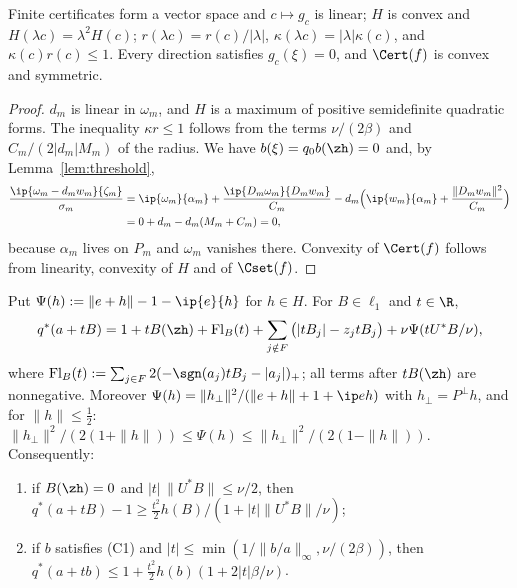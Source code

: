 \begin{lemma}[Algebra]\label{lem:algebra}
Finite certificates form a vector space and $c\mapsto g_c$ is linear; $H$ is
convex and $H(\lambda c)=\lambda^2H(c)$; $r(\lambda c)=r(c)/|\lambda|$,
$\kappa(\lambda c)=|\lambda|\kappa(c)$, and $\kappa(c)r(c)\le1$.  Every
direction satisfies $g_c(\xi)=0$, and $\Cert(f)$ is convex and symmetric.
\end{lemma}

\begin{proof}
$d_m$ is linear in $\omega_m$, and $H$ is a maximum of positive
semidefinite quadratic forms.  The inequality $\kappa r\le1$ follows from
the terms $\nu/(2\beta)$ and $C_m/(2|d_m|M_m)$ of the radius.  We have
$b(\xi)=q_0b(\zh)=0$ and, by Lemma~\ref{lem:threshold},
\begin{align*}
 \frac{\ip{\omega_m-d_mw_m}{\zeta_m}}{\sigma_m}
 &=\ip{\omega_m}{\alpha_m}+\frac{\ip{D_m\omega_m}{D_mw_m}}{C_m}
 -d_m\Big(\ip{w_m}{\alpha_m}+\frac{\|D_mw_m\|^2}{C_m}\Big)\\
 &=0+d_m-d_m(M_m+C_m)=0,
\end{align*}
because $\alpha_m$ lives on $P_m$ and $\omega_m$ vanishes there.  Convexity
of $\Cert(f)$ follows from linearity, convexity of $H$ and of $\Cset(f)$.
\end{proof}

\begin{lemma}\label{lem:base}
Put $\Psi(h):=\|e+h\|-1-\ip{e}{h}$ for $h\in H$.  For $B\in\ell_1$ and
$t\in\R$,
\begin{equation}\label{eq:baseidentity}
 q^*(a+tB)=1+tB(\zh)+\mathrm{Fl}_B(t)+\sum_{j\notin F}\big(|tB_j|-z_jtB_j\big)
 +\nu\Psi(tU^*B/\nu),
\end{equation}
where $\mathrm{Fl}_B(t):=\sum_{j\in F}2(-\sgn(a_j)tB_j-|a_j|)_+$; all terms
after $tB(\zh)$ are nonnegative.  Moreover
$\Psi(h)=\|h_\perp\|^2/(\|e+h\|+1+\ip eh)$ with $h_\perp=P^\perp h$, and
for $\|h\|\le\frac12$:
$\|h_\perp\|^2/(2(1+\|h\|))\le\Psi(h)\le\|h_\perp\|^2/(2(1-\|h\|))$.
Consequently:
\begin{enumerate}
\item[(a)] if $B(\zh)=0$ and $|t|\,\|U^*B\|\le\nu/2$, then
$q^*(a+tB)-1\ge\frac{t^2}{2}h(B)/(1+|t|\|U^*B\|/\nu)$;
\item[(b)] if $b$ satisfies \textup{(C1)} and
$|t|\le\min(1/\|b/a\|_\infty,\nu/(2\beta))$, then
$q^*(a+tb)\le1+\frac{t^2}2h(b)(1+2|t|\beta/\nu)$.
\end{enumerate}
\end{lemma}

